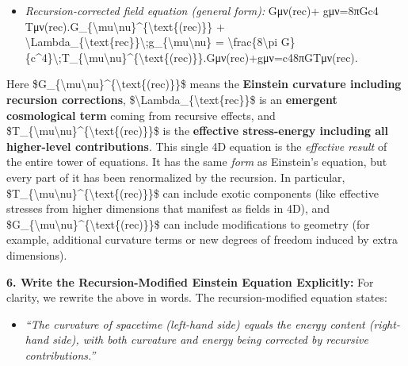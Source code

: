 \documentclass[
]{article}
\begin{document}
{\begin{itemize}
\item
  \emph{Recursion-corrected field equation (general form):}
  Gμν(rec)+\Lambdarec  gμν=8πGc4  Tμν(rec).G\_\{\textbackslash mu\textbackslash nu\}\^{}\{\textbackslash text\{(rec)\}\}
  +
  \textbackslash Lambda\_\{\textbackslash text\{rec\}\}\textbackslash;g\_\{\textbackslash mu\textbackslash nu\}
  = \textbackslash frac\{8\textbackslash pi
  G\}\{c\^{}4\}\textbackslash;T\_\{\textbackslash mu\textbackslash nu\}\^{}\{\textbackslash text\{(rec)\}\}.Gμν(rec)\hspace{0pt}+\Lambdarec\hspace{0pt}gμν\hspace{0pt}=c48πG\hspace{0pt}Tμν(rec)\hspace{0pt}.
\end{itemize}

Here
\$G\_\{\textbackslash mu\textbackslash nu\}\^{}\{\textbackslash text\{(rec)\}\}\$
means the \textbf{Einstein curvature including recursion corrections},
\$\textbackslash Lambda\_\{\textbackslash text\{rec\}\}\$ is an
\textbf{emergent cosmological term} coming from recursive effects, and
\$T\_\{\textbackslash mu\textbackslash nu\}\^{}\{\textbackslash text\{(rec)\}\}\$
is the \textbf{effective stress-energy including all higher-level
contributions}\hspace{0pt}. This single 4D equation is the
\emph{effective result} of the entire tower of equations. It has the
same \emph{form} as Einstein's equation, but every part of it has been
renormalized by the recursion. In particular,
\$T\_\{\textbackslash mu\textbackslash nu\}\^{}\{\textbackslash text\{(rec)\}\}\$
can include exotic components (like effective stresses from higher
dimensions that manifest as fields in 4D), and
\$G\_\{\textbackslash mu\textbackslash nu\}\^{}\{\textbackslash text\{(rec)\}\}\$
can include modifications to geometry (for example, additional curvature
terms or new degrees of freedom induced by extra dimensions).

\textbf{6. Write the Recursion-Modified Einstein Equation Explicitly:}
For clarity, we rewrite the above in words. The recursion-modified
equation states\hspace{0pt}:

\begin{itemize}
\item
  \emph{``The curvature of spacetime (left-hand side) equals the energy
  content (right-hand side), with both curvature and energy being
  corrected by recursive contributions.''}
\end{itemize}

}
\end{document}

